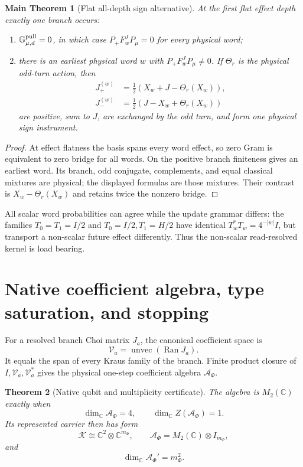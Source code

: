 \documentclass[11pt,oneside,openany]{book}
\numberwithin{equation}{chapter}
\newtheorem{theorem}{Theorem}[chapter]
\newtheorem{maintheorem}[theorem]{Main Theorem}
\theoremstyle{definition}
\theoremstyle{remark}
\newcommand{\C}{\mathbb C}
\newcommand{\Ran}{\operatorname{Ran}}
\begin{document}
\begin{maintheorem}[Flat all-depth sign alternative]
\label{thm:v6-sign-alternative}
At the first flat effect depth exactly one branch occurs:
\begin{enumerate}[label=\textup{(B\arabic*)},leftmargin=2.8em]
\item \(\mathbb G_{\mu,d}^{\rm pull}=0\), in which case
      \(P_+F_w^JP_\mu=0\) for every physical word;
\item there is an earliest physical word \(w\) with
      \(P_+F_w^JP_\mu\ne0\).  If \(\Theta_r\) is the physical odd-turn action, then
      \[
       \boxed{
       \begin{aligned}
       J_+^{(w)}&=\tfrac12(X_w+J-\Theta_r(X_w)),\\
       J_-^{(w)}&=\tfrac12(J-X_w+\Theta_r(X_w))
       \end{aligned}}
      \]
      are positive, sum to \(J\), are exchanged by the odd turn, and form one
      physical sign instrument.
\end{enumerate}
\end{maintheorem}

\begin{proof}
At effect flatness the basis spans every word effect, so zero Gram is
equivalent to zero bridge for all words.  On the positive branch finiteness
gives an earliest word.  Its branch, odd conjugate, complements, and equal
classical mixtures are physical; the displayed formulas are those mixtures.
Their contrast is \(X_w-\Theta_r(X_w)\) and retains twice the nonzero bridge.
\end{proof}

All scalar word probabilities can agree while the update grammar differs: the
families \(T_0=T_1=I/2\) and \(T_0=I/2,T_1=H/2\) have identical
\(T_w^*T_w=4^{-|w|}I\), but transport a non-scalar future effect differently.
Thus the non-scalar read-resolved kernel is load bearing.

\section{Native coefficient algebra, type saturation, and stopping}
For a resolved branch Choi matrix \(J_a\), the canonical coefficient space is
\[
 \mathcal V_a=\operatorname{unvec}(\Ran J_a).
\]
It equals the span of every Kraus family of the branch.  Finite product closure
of \(I,\mathcal V_a,\mathcal V_a^*\) gives the physical one-step coefficient
algebra \(\mathcal A_\Phi\).

\begin{theorem}[Native qubit and multiplicity certificate]
\label{thm:v6-native-qubit}
The algebra is \(M_2(\C)\) exactly when
\[
 \boxed{\dim_\C\mathcal A_\Phi=4,
 \qquad \dim_\C Z(\mathcal A_\Phi)=1.}
\]
Its represented carrier then has form
\[
 \mathcal K\cong\C^2\otimes\C^{m_\Phi},
 \qquad \mathcal A_\Phi=M_2(\C)\otimes I_{m_\Phi},
\]
and
\[
 \boxed{\dim_\C\mathcal A_\Phi'=m_\Phi^2.}
\]
\end{theorem}
\end{document}
